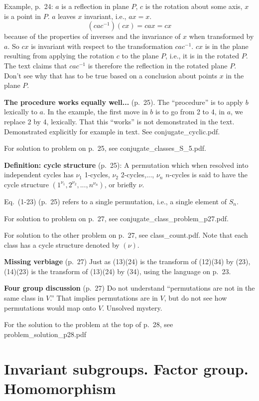 Example, p.\ 24: $a$ is a reflection in plane $P$, $c$ is the rotation
about some axis, $x$ is a point in $P$. $a$ leaves $x$ invariant,
i.e., $ax = x$.
$$
(cac^{-1})(cx) = cax = cx
$$ because of the properties of inverses and the invariance of $x$
when transformed by $a$. So $cx$ is invariant with respect to the
transformation $cac^{-1}$. $cx$ is in the plane resulting from
applying the rotation $c$ to the plane $P$, i.e., it is in the rotated
$P$. The text claims that $cac^{-1}$ is therefore the reflection in
the rotated plane $P$. Don't see why that has to be true based on a
conclusion about points $x$ in the plane $P$.

{\bf The procedure works equally well...} (p.\ 25). The ``procedure''
is to apply $b$ lexically to $a$. In the example, the first move in $b$
is to go from 2 to 4, in $a$, we replace 2 by 4, lexically. That this
``works'' is not demonstrated in the text. Demonstrated explicitly
for example in text. See conjugate\_cyclic.pdf.

For solution to problem on p.\ 25, see conjugate\_classes\_S\_5.pdf.

{\bf Definition: cycle structure} (p.\ 25): A permutation which when
resolved into independent cycles has $\nu_1$ 1-cycles, $\nu_2$
2-cycles,..., $\nu_n$ $n$-cycles is said to have the cycle structure
$(1^{\nu_1},2^{\nu_2},...,n^{\nu_n})$, or briefly $\nu$.

Eq.\ (1-23) (p.\ 25) refers to a single permutation, i.e., a single element of $S_n$.

For solution to problem on p.\ 27, see conjugate\_class\_problem\_p27.pdf.

For solution to the other problem on p.\ 27, see class\_count.pdf. Note
that each class has a cycle structure denoted by $(\nu)$.

{\bf Missing verbiage} (p.\ 27) Just as (13)(24) is the transform of
(12)(34) by (23), (14)(23) is the transform of (13)(24) by (34), using
the language on p.\ 23.

{\bf Four group discussion} (p.\ 27) Do not understand ``permutations
are not in the same class in $V$.'' That implies permutations are in
$V$, but do not see how permutations would map onto $V$. Unsolved
mystery.

For the solution to the problem at the top of p.\ 28, see
problem\_solution\_p28.pdf

\section{Invariant subgroups. Factor group. Homomorphism}

